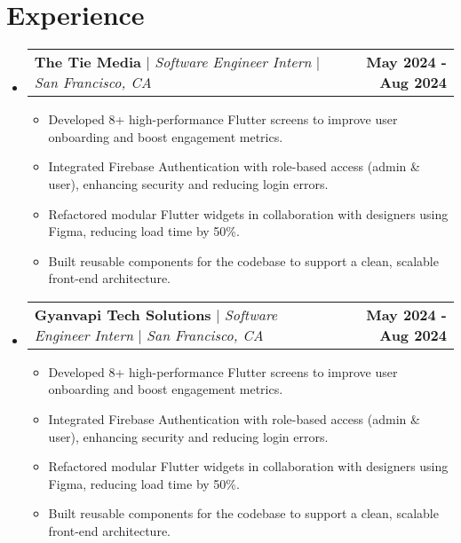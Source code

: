\documentclass[a4paper,10pt]{article}
\makeatletter
\newcommand{\resumeItem}[1]{\item\small{{#1 \vspace{-2pt}}}}
\newcommand{\resumeProjectHeading}[2]{
    \item
    \begin{tabular*}{1.001\textwidth}{l@{\extracolsep{\fill}}r}
      \small#1 & \textbf{\small #2}\\
    \end{tabular*}\vspace{-7pt}
}
\newcommand{\resumeSubHeadingListStart}{\begin{itemize}[leftmargin=0.0in, label={}]}
\newcommand{\resumeSubHeadingListEnd}{\end{itemize}}
\newcommand{\resumeItemListStart}{\begin{itemize}}
\newcommand{\resumeItemListEnd}{\end{itemize}\vspace{-5pt}}
\makeatother
\begin{document}
\section{Experience}
  \vspace{-4pt}
    \resumeSubHeadingListStart
      \resumeProjectHeading
      {\textbf{The Tie Media} $|$ \emph{Software Engineer Intern}  $|$ \emph{San Francisco, CA}}{May 2024 - Aug 2024}
      \vspace{-8pt}
        \resumeItemListStart
            \resumeItem{Developed 8+ high-performance Flutter screens to improve user onboarding and boost engagement metrics.}
            \resumeItem{Integrated Firebase Authentication with role-based access (admin \& user), enhancing security and reducing login errors.}
            \resumeItem{Refactored modular Flutter widgets in collaboration with designers using Figma, reducing load time by 50\%.}
            \resumeItem{Built reusable components for the codebase to support a clean, scalable front-end architecture.}
        \resumeItemListEnd
        \vspace{-8pt}
        
      \resumeProjectHeading
        {\textbf{Gyanvapi Tech Solutions} $|$ \emph{Software Engineer Intern}  $|$ \emph{San Francisco, CA}}{May 2024 - Aug 2024}
        \vspace{-8pt}
        \resumeItemListStart
            \resumeItem{Developed 8+ high-performance Flutter screens to improve user onboarding and boost engagement metrics.}
            \resumeItem{Integrated Firebase Authentication with role-based access (admin \& user), enhancing security and reducing login errors.}
            \resumeItem{Refactored modular Flutter widgets in collaboration with designers using Figma, reducing load time by 50\%.}
            \resumeItem{Built reusable components for the codebase to support a clean, scalable front-end architecture.}
        \resumeItemListEnd
        \vspace{0pt}

    \resumeSubHeadingListEnd
\vspace{-8pt}
\end{document}
